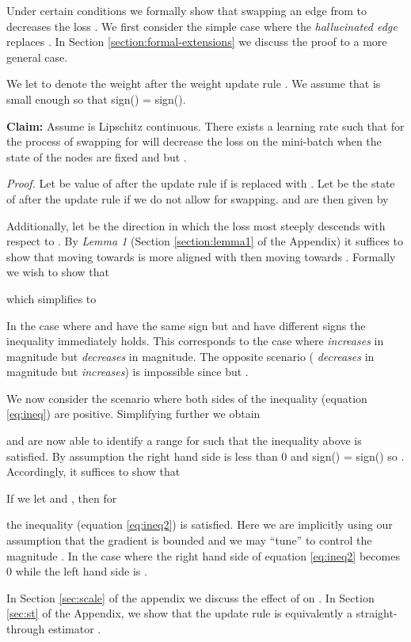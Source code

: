 \documentclass{article}
\begin{document}
Under certain conditions we formally show that swapping an edge from  to  decreases the loss . We first consider the simple case where the \textit{hallucinated edge}  replaces . In Section \ref{section:formal-extensions} we discuss the proof to a more general case.

We let  to denote the weight  after the weight update rule . We assume that  is small enough so that sign() = sign().

\textbf{Claim:} Assume  is Lipschitz continuous. There exists a learning rate  such that for  the process of swapping  for  will decrease the loss on the mini-batch when the state of the nodes are fixed and  but .

\textit{Proof.} Let  be value of  after the update rule if  is replaced with . Let  be the state of  after the update rule if we do not allow for swapping.  and  are then given by

Additionally, let  be the direction in which the loss most steeply descends with respect to . By \textit{Lemma 1} (Section \ref{section:lemma1} of the Appendix) it suffices to show that moving  towards  is more aligned with  then moving  towards . Formally we wish to show that

which simplifies to

In the case where  and  have the same sign but  and  have different signs the inequality immediately holds. This corresponds to the case where  \textit{increases} in magnitude but  \textit{decreases} in magnitude. The opposite scenario ( \textit{decreases} in magnitude but  \textit{increases}) is impossible since  but .

We now consider the scenario where both sides of the inequality (equation \ref{eq:ineq}) are positive. Simplifying further we obtain

and are now able to identify a range for  such that the inequality above is satisfied. By assumption the right hand side is less than 0 and sign() = sign() so . Accordingly, it suffices to show that 

If we let  and , then for 

the inequality (equation \ref{eq:ineq2}) is satisfied. Here we are implicitly using our assumption that the gradient is bounded and we may ``tune''  to control the magnitude . In the case where  the right hand side of equation \ref{eq:ineq2} becomes 0 while the left hand side is .

In Section \ref{sec:scale} of the appendix we discuss the effect of  on . In Section \ref{sec:st} of the Appendix, we show that the update rule is equivalently a straight-through estimator \cite{st}.
\end{document}

